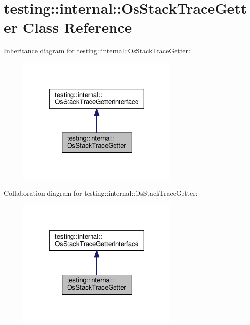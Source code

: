 \hypertarget{classtesting_1_1internal_1_1OsStackTraceGetter}{}\section{testing\+:\+:internal\+:\+:Os\+Stack\+Trace\+Getter Class Reference}
\label{classtesting_1_1internal_1_1OsStackTraceGetter}


Inheritance diagram for testing\+:\+:internal\+:\+:Os\+Stack\+Trace\+Getter\+:\nopagebreak
\begin{figure}[H]
\begin{center}
\leavevmode
\includegraphics[width=225pt]{classtesting_1_1internal_1_1OsStackTraceGetter__inherit__graph}
\end{center}
\end{figure}


Collaboration diagram for testing\+:\+:internal\+:\+:Os\+Stack\+Trace\+Getter\+:\nopagebreak
\begin{figure}[H]
\begin{center}
\leavevmode
\includegraphics[width=225pt]{classtesting_1_1internal_1_1OsStackTraceGetter__coll__graph}
\end{center}
\end{figure}
